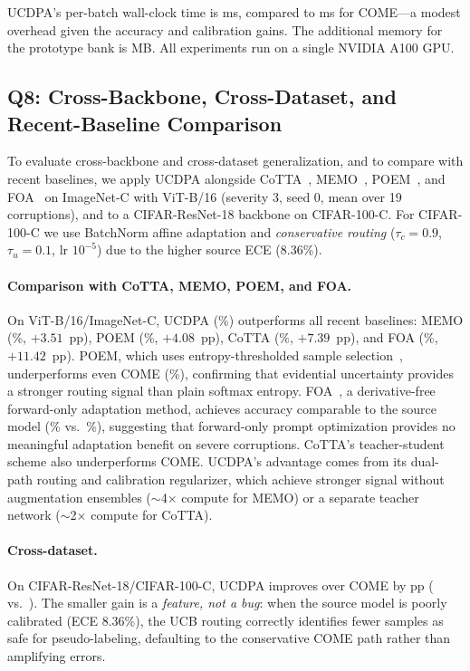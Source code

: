 UCDPA's per-batch wall-clock time is \ucdpatimeperbatch{} ms, compared to \cometimeperbatch{} ms for COME---a modest overhead given the accuracy and calibration gains. The additional memory for the prototype bank is \ucdpamemory{} MB. All experiments run on a single NVIDIA A100 GPU.

\subsection{Q8: Cross-Backbone, Cross-Dataset, and Recent-Baseline Comparison}
\label{sec:exp:cross-backbone}



To evaluate cross-backbone and cross-dataset generalization, and to compare with recent baselines, we apply UCDPA alongside CoTTA~\citep{wang2022cotta}, MEMO~\citep{zhang2022memo}, POEM~\citep{yi2025poem}, and FOA~\citep{niu2024foa} on ImageNet-C with ViT-B/16 (severity 3, seed 0, mean over 19 corruptions), and to a CIFAR-ResNet-18 backbone on CIFAR-100-C. For CIFAR-100-C we use BatchNorm affine adaptation and \emph{conservative routing} ($\tau_c=0.9$, $\tau_u=0.1$, lr $10^{-5}$) due to the higher source ECE (8.36\%).

\paragraph{Comparison with CoTTA, MEMO, POEM, and FOA.}
On ViT-B/16/ImageNet-C, UCDPA (\vitUcdpaAcc\%) outperforms all recent baselines: MEMO (\memoAcc\%, $+3.51$~pp), POEM (\poemAcc\%, $+4.08$~pp), CoTTA (\cottaAcc\%, $+7.39$~pp), and FOA (\foaAcc\%, $+11.42$~pp). POEM, which uses entropy-thresholded sample selection~\citep{yi2025poem}, underperforms even COME (\vitComeAcc\%), confirming that evidential uncertainty provides a stronger routing signal than plain softmax entropy. FOA~\citep{niu2024foa}, a derivative-free forward-only adaptation method, achieves accuracy comparable to the source model (\foaAcc\% vs.\ \vitSourceAcc\%), suggesting that forward-only prompt optimization provides no meaningful adaptation benefit on severe corruptions. CoTTA's teacher-student scheme also underperforms COME. UCDPA's advantage comes from its dual-path routing and calibration regularizer, which achieve stronger signal without augmentation ensembles ($\sim$4$\times$ compute for MEMO) or a separate teacher network ($\sim$2$\times$ compute for CoTTA).

\paragraph{Cross-dataset.}
On CIFAR-ResNet-18/CIFAR-100-C, UCDPA improves over COME by \cifarUcdpaDelta{} pp (\cifarUcdpaAcc{} vs.\ \cifarComeAcc{}). The smaller gain is a \emph{feature, not a bug}: when the source model is poorly calibrated (ECE 8.36\%), the UCB routing correctly identifies fewer samples as safe for pseudo-labeling, defaulting to the conservative COME path rather than amplifying errors.


